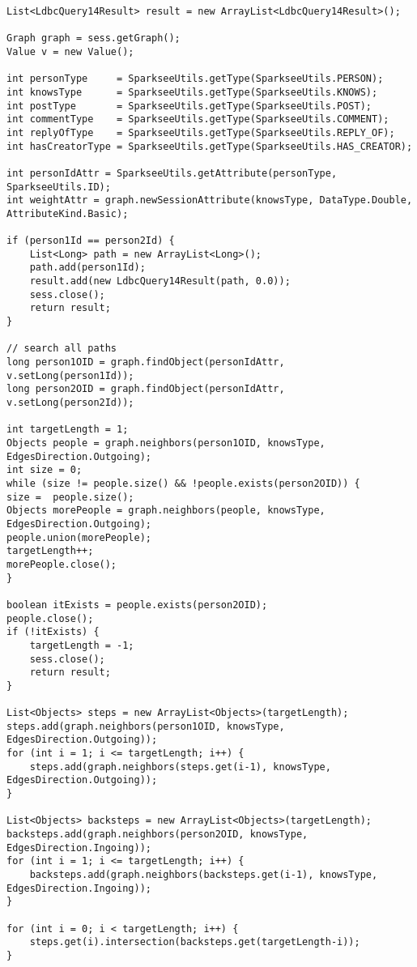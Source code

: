 {\footnotesize
\begin{verbatim}
List<LdbcQuery14Result> result = new ArrayList<LdbcQuery14Result>();

Graph graph = sess.getGraph();
Value v = new Value();

int personType     = SparkseeUtils.getType(SparkseeUtils.PERSON);
int knowsType      = SparkseeUtils.getType(SparkseeUtils.KNOWS);
int postType       = SparkseeUtils.getType(SparkseeUtils.POST);
int commentType    = SparkseeUtils.getType(SparkseeUtils.COMMENT);
int replyOfType    = SparkseeUtils.getType(SparkseeUtils.REPLY_OF);
int hasCreatorType = SparkseeUtils.getType(SparkseeUtils.HAS_CREATOR);

int personIdAttr = SparkseeUtils.getAttribute(personType, SparkseeUtils.ID);
int weightAttr = graph.newSessionAttribute(knowsType, DataType.Double, AttributeKind.Basic);

if (person1Id == person2Id) {
    List<Long> path = new ArrayList<Long>();
    path.add(person1Id);
    result.add(new LdbcQuery14Result(path, 0.0));
    sess.close();
    return result;
}

// search all paths
long person1OID = graph.findObject(personIdAttr, v.setLong(person1Id));
long person2OID = graph.findObject(personIdAttr, v.setLong(person2Id));

int targetLength = 1;
Objects people = graph.neighbors(person1OID, knowsType, EdgesDirection.Outgoing);
int size = 0;
while (size != people.size() && !people.exists(person2OID)) {
size =  people.size();
Objects morePeople = graph.neighbors(people, knowsType, EdgesDirection.Outgoing);
people.union(morePeople);
targetLength++;
morePeople.close();
}

boolean itExists = people.exists(person2OID);
people.close();
if (!itExists) {
    targetLength = -1;
    sess.close();
    return result;
}

List<Objects> steps = new ArrayList<Objects>(targetLength);
steps.add(graph.neighbors(person1OID, knowsType, EdgesDirection.Outgoing));
for (int i = 1; i <= targetLength; i++) {
    steps.add(graph.neighbors(steps.get(i-1), knowsType, EdgesDirection.Outgoing));
}

List<Objects> backsteps = new ArrayList<Objects>(targetLength);
backsteps.add(graph.neighbors(person2OID, knowsType, EdgesDirection.Ingoing));
for (int i = 1; i <= targetLength; i++) {
    backsteps.add(graph.neighbors(backsteps.get(i-1), knowsType, EdgesDirection.Ingoing));
}

for (int i = 0; i < targetLength; i++) {
    steps.get(i).intersection(backsteps.get(targetLength-i));
}


\end{verbatim}}
